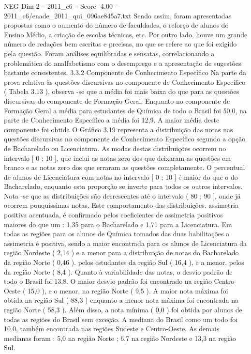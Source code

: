 \begin{textsample}{NEG Dim 2 – 2011\_c6 – Score -4.00 – 2011\_c6/enade\_2011\_qui\_096ae845a7.txt}
Sendo assim, foram apresentadas propostas como o aumento do número de faculdades, o reforço de alunos do Ensino Médio, a criação de escolas técnicas, etc.
Por outro lado, houve um grande número de redações bem escritas e precisas, no que se refere ao que foi exigido pela questão.
Foram análises equilibradas e sensatas, correlacionando a problemática do analfabetismo com o desemprego e a apresentação de sugestões bastante consistentes. 3.3.2 Componente de Conhecimento Específico Na parte da prova relativa às questões discursivas no componente de Conhecimento Específico ( Tabela 3.13 ), observa -se que a média foi mais baixa do que para as questões discursivas do componente de Formação Geral.
Enquanto no componente de Formação Geral a média para estudantes de Química de todo o Brasil foi 50,0, na parte de Conhecimento Específico a média foi 12,9.
A maior média deste componente foi obtida O Gráfico 3.19 representa a distribuição das notas nas questões discursivas no componente de Conhecimento Específico segundo a opção de Bacharelado ou Licenciatura.
As modas destas distribuições ocorrem no intervalo [ 0 ; 10 ], que inclui as notas zero dos que deixaram as questões em branco e as notas zero dos que erraram as questões completamente.
O percentual de alunos de Licenciatura com notas no intervalo [ 0 ; 10 ] é maior do que o do Bacharelado, enquanto esta proporção se inverte para todos os outros intervalos.
Nota -se que as distribuições são decrescentes até o intervalo ( 80 ; 90 ], onde já ocorrem pouquíssimas notas.
Este comportamento das distribuições, assimetria positiva acentuada, é confirmado pelos coeficientes de assimetria positivos maiores do que um : 1,35 para o Bacharelado e 1,71 para a Licenciatura.
Em todas as regiões para os alunos de Química tomados das duas habilitações a assimetria é positiva, sendo a maior encontrada para os alunos de Licenciatura da região Nordeste ( 2,14 ) e a menor para a distribuição de notas do Bacharelado da região Norte ( 0,46 ). pelos estudantes da região Sul ( 16,4 ), e a menor, pelos da região Norte ( 8,4 ).
Quanto à variabilidade das notas, o desvio padrão de todo o Brasil foi 13,8.
O maior desvio padrão foi encontrado na região Centro-Oeste ( 15,0 ), e o menor, na região Norte ( 9,5 ).
A maior nota máxima foi obtida na região Sul ( 88,3 ) enquanto a menor nota máxima foi encontrada na região Norte ( 58,3 ).
Além disso, a nota mínima ( 0,0 ) foi obtida por alunos de todas as regiões do Brasil sem exceção.
A mediana do Brasil como um todo foi 10,0, também encontrada nas regiões Sudeste e Centro-Oeste.
As demais medianas foram : 5,0 na região Norte ; 6,7 na região Nordeste e 13,3 na região Sul.

\end{textsample}
